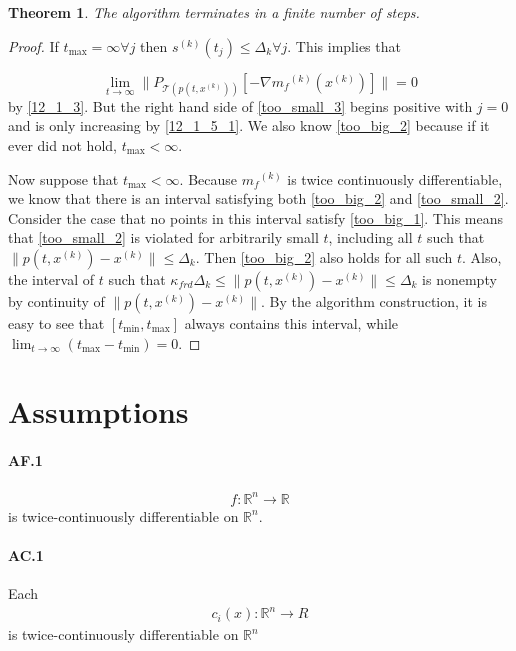 \documentclass{article}
\newtheorem{theorem}{Theorem}[section]
\theoremstyle{case}
\newcommand{\modelk}{{{m}_f}^{(k)}}
\newcommand{\iteratek}{{x}^{(k)}}
\newcommand{\trialk}{{s}^{(k)}}
\newcommand{\ptx}{p(t,\iteratek)}
\newcommand{\tj}{t_j}
\begin{document}
\begin{theorem}
The algorithm terminates in a finite number of steps.
\end{theorem}

\begin{proof}
If $t_{\text{max}} = \infty \forall j$ then $\trialk(\tj) \le  \Delta_k \forall j$.
This implies that

\[\lim_{t\to\infty}\|P_{\mathcal T(\ptx)}[-\nabla \modelk(\iteratek)]\| = 0\]
by \ref{12_1_3}.
But the right hand side of \ref{too_small_3} begins positive with $j=0$ and is only increasing by \ref{12_1_5_1}.
We also know \ref{too_big_2} because if it ever did not hold, $t_{\text{max}} < \infty$.

Now suppose that $t_{\text{max}} < \infty$.
Because $\modelk$ is twice continuously differentiable, we know that there is an interval satisfying both \ref{too_big_2} and \ref{too_small_2}.
Consider the case that no points in this interval satisfy \ref{too_big_1}.
This means that \ref{too_small_2} is violated for arbitrarily small $t$, including all $t$ such that $\|\ptx-\iteratek\| \le \Delta_k$.
Then \ref{too_big_2} also holds for all such $t$.
Also, the interval of $t$ such that $\kappa_{frd}\Delta_k \le \|\ptx - \iteratek\|\le \Delta_k$ is nonempty by continuity of $\|\ptx - \iteratek\|$.
By the algorithm construction, it is easy to see that $[t_{\text{min}}, t_{\text{max}}]$ always contains this interval, while $\lim_{t\to\infty}(t_{\text{max}} - t_{\text{min}}) = 0$.

\end{proof}

\appendix

\section{Assumptions}

\paragraph{AF.1}
\begin{align}
f: \mathbb R^n \to \mathbb R
\end{align}
is twice-continuously differentiable on $\mathbb R^n$.

\paragraph{AC.1}
Each
\begin{align}
c_i(x): \mathbb R^n \to R
\end{align}
is twice-continuously differentiable on $\mathbb R^n$
\end{document}
